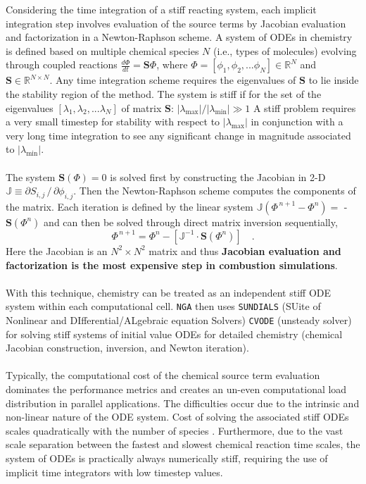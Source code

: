 \documentclass{homework}
\begin{document}
\normalsize
Considering the time integration of a stiff reacting system, each implicit integration step involves evaluation of the source terms by Jacobian evaluation and factorization in a Newton-Raphson scheme. A system of ODEs in chemistry is defined based on multiple chemical species $N$ (i.e., types of molecules) evolving through coupled reactions $\frac{d \Phi}{d t} = \mathbf{S} \Phi$, where $\Phi = [\phi_1, \phi_2, ... \phi_N] \in \mathbb{R}^N$ and $\mathbf{S} \in \mathbb{R}^{N \times N}$. Any time integration scheme requires the eigenvalues of $\mathbf{S}$ to lie inside the stability region of the method. The system is stiff if for the set of the eigenvalues $[\lambda_1, \lambda_2, ... \lambda_N]$ of matrix $\mathbf{S}$: $|\lambda_\textrm{max}|/|\lambda_\textrm{min}| \gg 1$
A stiff problem requires a very small timestep for stability with respect to $|\lambda_\textrm{max}|$ in conjunction with a very long time integration to see any significant change in magnitude associated to $|\lambda_\textrm{min}|$.
\\ \\ \noindent
The system $\mathbf{S}(\Phi) = 0$ is solved first by constructing the Jacobian in 2-D $\mathbb{J} \equiv \partial S_{i,j} \, / \, \partial \phi_{i,j}$. Then the Newton-Raphson scheme computes the components of the matrix. Each iteration is defined by the linear system $\mathbb{J}(\Phi^{\, n+1} - \Phi^n) = $ -$ \mathbf{S}(\Phi^n)$ and can then be solved through direct matrix inversion sequentially,
$$ \Phi^{\, n+1} = \Phi^n - [\mathbb{J}^{-1} \cdot \mathbf{S}(\Phi^n)] \quad \textrm{.} $$
Here the Jacobian is an $N^2 \times N^2$ matrix and thus \textbf{Jacobian evaluation and factorization is the most expensive step in combustion simulations}.
\\ \\ \noindent
With this technique, chemistry can be treated as an independent stiff ODE system within each computational cell. \texttt{NGA} then uses \texttt{SUNDIALS} \cite{SUNDIALS} (SUite of Nonlinear and DIfferential/ALgebraic equation Solvers) \texttt{CVODE} (unsteady solver) for solving stiff systems of initial value ODEs for detailed chemistry (chemical Jacobian construction, inversion, and Newton iteration). 
\\ \\ \noindent
Typically, the computational cost of the chemical source term evaluation dominates the performance metrics and creates an un-even computational load distribution in parallel applications. The difficulties occur due to the intrinsic and non-linear nature of the ODE system. Cost of solving the associated stiff ODEs scales quadratically with the number of species \cite{DLBFoam_1,DLBFoam_2}. Furthermore, due to the vast scale separation between the fastest and slowest chemical reaction time scales, the system of ODEs is practically always numerically stiff, requiring the use of implicit time integrators with low timestep values.
\end{document}

